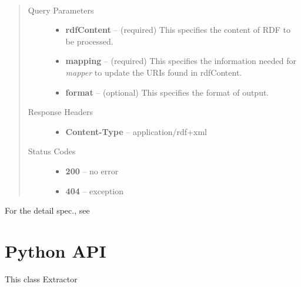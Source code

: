 \documentclass[letterpaper,10pt,english]{sphinxmanual}
\begin{document}
\begin{fulllineitems}
\label{api_ref:post--mapper_?rdfContent, mapping, format_}~\begin{quote}\begin{description}
\item[{Query Parameters}] \leavevmode\begin{itemize}
\item {} 
\textbf{rdfContent} -- (required) This specifies the content of RDF to be processed.

\item {} 
\textbf{mapping} -- (required) This specifies the information needed for \emph{mapper} to update the URIs found in rdfContent.

\item {} 
\textbf{format} -- (optional) This specifies the format of output.

\end{itemize}

\item[{Response Headers}] \leavevmode\begin{itemize}
\item {} 
\textbf{Content-Type} -- application/rdf+xml

\end{itemize}

\item[{Status Codes}] \leavevmode\begin{itemize}
\item {} 
\textbf{200} -- no error

\item {} 
\textbf{404} -- exception

\end{itemize}

\end{description}\end{quote}

\end{fulllineitems}


For the detail spec., see 


\section{Python API}
\label{api_ref:python-api}
This class Extractor
\end{document}
